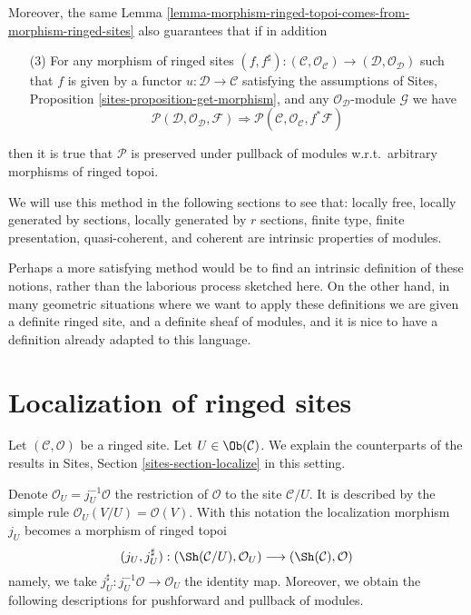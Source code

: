 \medskip\noindent
Moreover, the same
Lemma \ref{lemma-morphism-ringed-topoi-comes-from-morphism-ringed-sites}
also guarantees that if in addition
\begin{enumerate}
\item[(3)] For any morphism of ringed sites
$(f, f^\sharp) :
(\mathcal{C}, \mathcal{O}_\mathcal{C})
\to
(\mathcal{D}, \mathcal{O}_\mathcal{D})$
such that $f$ is given by a functor
$u : \mathcal{D} \to \mathcal{C}$ satisfying the
assumptions of Sites, Proposition \ref{sites-proposition-get-morphism},
and any $\mathcal{O}_\mathcal{D}$-module $\mathcal{G}$
we have
$$
\mathcal{P}(\mathcal{D}, \mathcal{O}_\mathcal{D}, \mathcal{F})
\Rightarrow
\mathcal{P}(\mathcal{C}, \mathcal{O}_\mathcal{C}, f^*\mathcal{F})
$$
\end{enumerate}
then it is true that $\mathcal{P}$ is preserved under pullback
of modules w.r.t.\ arbitrary morphisms of ringed topoi.

\medskip\noindent
We will use this method in the following sections to see
that:
locally free,
locally generated by sections,
locally generated by $r$ sections,
finite type,
finite presentation,
quasi-coherent, and
coherent
are intrinsic properties of modules.

\medskip\noindent
Perhaps a more satisfying method would be to find an intrinsic definition
of these notions, rather than the laborious process sketched here.
On the other hand, in many geometric situations where we want to apply
these definitions we are given a definite ringed site, and a definite
sheaf of modules, and it is nice to have a definition already adapted to
this language.




\section{Localization of ringed sites}
\label{section-localize}

\noindent
Let $(\mathcal{C}, \mathcal{O})$ be a ringed site.
Let $U \in \Ob(\mathcal{C})$.
We explain the counterparts of the results in
Sites, Section \ref{sites-section-localize}
in this setting.

\medskip\noindent
Denote
$\mathcal{O}_U = j_U^{-1}\mathcal{O}$ the restriction of $\mathcal{O}$
to the site $\mathcal{C}/U$. It is described by the simple
rule $\mathcal{O}_U(V/U) = \mathcal{O}(V)$. With this notation
the localization morphism $j_U$ becomes a morphism of ringed topoi
$$
(j_U, j_U^\sharp) :
(\Sh(\mathcal{C}/U), \mathcal{O}_U)
\longrightarrow
(\Sh(\mathcal{C}), \mathcal{O})
$$
namely, we take $j_U^\sharp : j_U^{-1}\mathcal{O} \to \mathcal{O}_U$
the identity map.
Moreover, we obtain the following descriptions for pushforward
and pullback of modules.

